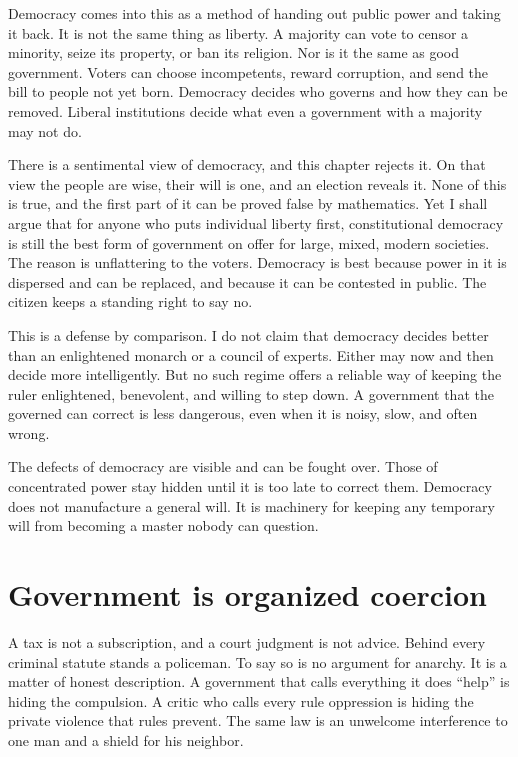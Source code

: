 \documentclass[12pt,a4paper]{book}
\begin{document}
Democracy comes into this as a method of handing out public power and taking it back. It is not the same thing as liberty. A majority can vote to censor a minority, seize its property, or ban its religion. Nor is it the same as good government. Voters can choose incompetents, reward corruption, and send the bill to people not yet born. Democracy decides who governs and how they can be removed. Liberal institutions decide what even a government with a majority may not do.

There is a sentimental view of democracy, and this chapter rejects it. On that view the people are wise, their will is one, and an election reveals it. None of this is true, and the first part of it can be proved false by mathematics. Yet I shall argue that for anyone who puts individual liberty first, constitutional democracy is still the best form of government on offer for large, mixed, modern societies. The reason is unflattering to the voters. Democracy is best because power in it is dispersed and can be replaced, and because it can be contested in public. The citizen keeps a standing right to say no.

This is a defense by comparison. I do not claim that democracy decides better than an enlightened monarch or a council of experts. Either may now and then decide more intelligently. But no such regime offers a reliable way of keeping the ruler enlightened, benevolent, and willing to step down. A government that the governed can correct is less dangerous, even when it is noisy, slow, and often wrong.

The defects of democracy are visible and can be fought over. Those of concentrated power stay hidden until it is too late to correct them. Democracy does not manufacture a general will. It is machinery for keeping any temporary will from becoming a master nobody can question.

\section{Government is organized coercion}

A tax is not a subscription, and a court judgment is not advice. Behind every criminal statute stands a policeman. To say so is no argument for anarchy. It is a matter of honest description. A government that calls everything it does ``help'' is hiding the compulsion. A critic who calls every rule oppression is hiding the private violence that rules prevent. The same law is an unwelcome interference to one man and a shield for his neighbor.
\end{document}
